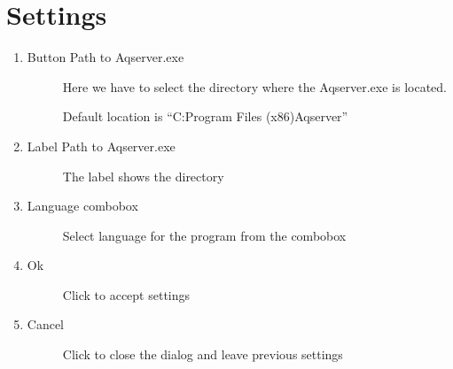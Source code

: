 \documentclass[a4paper,10pt,english]{sphinxmanual}
\begin{document}
\chapter{Settings}
\label{\detokenize{settings:settings}}\label{\detokenize{settings::doc}}
\begin{enumerate}
%
\item {} \begin{description}
\item[{Button Path to Aqserver.exe}] \leavevmode
Here we have to select the directory where the Aqserver.exe is located.
\begin{quote}

\end{quote}

Default location is “C:Program Files (x86)Aqserver”

\end{description}

\item {} \begin{description}
\item[{Label Path to Aqserver.exe}] \leavevmode
The label shows the directory

\end{description}

\item {} \begin{description}
\item[{Language combobox}] \leavevmode
Select language for the program from the combobox

\end{description}

\item {} \begin{description}
\item[{Ok}] \leavevmode
Click to accept settings

\end{description}

\item {} \begin{description}
\item[{Cancel}] \leavevmode
Click to close the dialog and leave previous settings

\end{description}

\end{enumerate}
\end{document}
